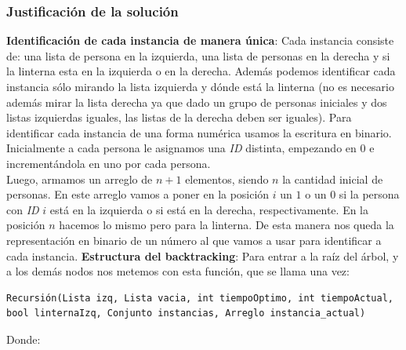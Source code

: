 \subsubsection{Justificaci\'on de la soluci\'on}

\textbf{Identificación de cada instancia de manera única}: 
Cada instancia consiste de: una lista de persona en la izquierda, una lista de personas en la derecha y si la linterna esta en la izquierda o en la derecha.
Además podemos identificar cada instancia sólo mirando la lista izquierda y dónde está la linterna (no es necesario además mirar la lista derecha ya que dado un grupo de personas iniciales y dos listas izquierdas iguales, las listas de la derecha deben ser iguales). 
\newline
\newline
Para identificar cada instancia de una forma numérica usamos la escritura en binario. Inicialmente a cada persona le asignamos una \emph{ID} distinta, empezando en $0$ e incrementándola en uno por cada persona.
\\
Luego, armamos un arreglo de $n + 1$ elementos, siendo $n$ la cantidad inicial de personas. En este arreglo vamos a poner en la posición $i$ un $1$ o un $0$ si la persona con \emph{ID} $i$ está en la izquierda o si está en la derecha, respectivamente. En la posición $n$ hacemos lo mismo pero para la linterna.
De esta manera nos queda la representación en binario de un número al que vamos a usar para identificar a cada instancia.
   \newline
   \newline
   \textbf{Estructura del backtracking}:
   Para entrar a la raíz del árbol, y a los demás nodos nos metemos con esta función, que se llama una vez:
\begin{verbatim}
Recursión(Lista izq, Lista vacia, int tiempoOptimo, int tiempoActual, bool linternaIzq, Conjunto instancias, Arreglo instancia_actual)
\end{verbatim}   
Donde:
